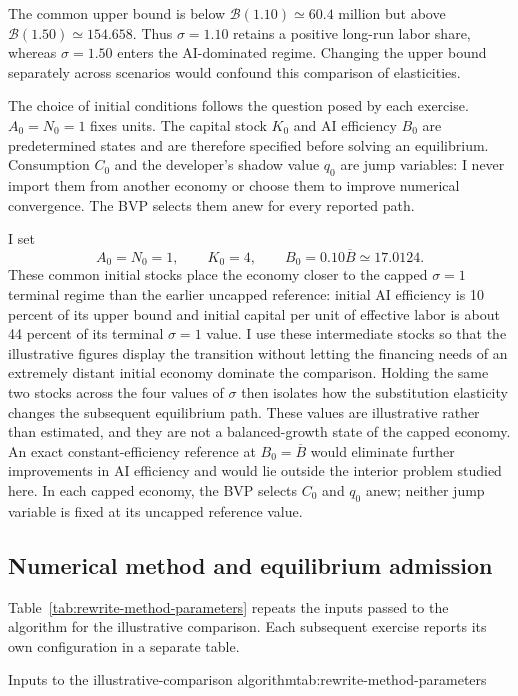 The common upper bound is below $\mathcal B(1.10)\simeq60.4$ million but above
$\mathcal B(1.50)\simeq154.658$. Thus $\sigma=1.10$ retains a positive
long-run labor share, whereas $\sigma=1.50$ enters the AI-dominated regime.
Changing the upper bound separately across scenarios would confound this
comparison of elasticities.

The choice of initial conditions follows the question posed by each exercise.
$A_0=N_0=1$ fixes units. The capital stock $K_0$ and AI efficiency $B_0$ are
predetermined states and are therefore specified before solving an
equilibrium. Consumption $C_0$ and the developer's shadow value $q_0$ are jump
variables: I never import them from another economy or choose them to improve
numerical convergence. The BVP selects them anew for every reported path.

I set
\begin{equation}
 A_0=N_0=1,\qquad K_0=4,\qquad B_0=0.10\overline B\simeq17.0124.
 \label{eq:rewrite-simulation-initial-stocks}
\end{equation}
These common initial stocks place the economy closer to the capped
$\sigma=1$ terminal regime than the earlier uncapped reference: initial AI
efficiency is 10 percent of its upper bound and initial capital per unit of
effective labor is about 44 percent of its terminal $\sigma=1$ value. I use
these intermediate stocks so that the illustrative figures display the transition
without letting the financing needs of an extremely distant initial economy
dominate the comparison. Holding the same two stocks across the four values of
$\sigma$ then isolates how the substitution elasticity changes the subsequent
equilibrium path. These values are illustrative rather than estimated, and
they are not a balanced-growth state of the capped economy. An exact
constant-efficiency reference at $B_0=\overline B$ would eliminate further
improvements in AI efficiency and would lie outside the interior problem
studied here. In each capped economy, the BVP selects $C_0$ and $q_0$ anew;
neither jump variable is fixed at its uncapped reference value.

\subsection{Numerical method and equilibrium admission}
\label{subsec:rewrite-method}

Table~\ref{tab:rewrite-method-parameters} repeats the inputs passed to the
algorithm for the illustrative comparison. Each subsequent exercise reports its own
configuration in a separate table.
\begin{rewriteParameterTable}{Inputs to the illustrative-comparison algorithm}{tab:rewrite-method-parameters}
\rewriteMainParameterRows
\end{rewriteParameterTable}

